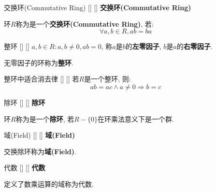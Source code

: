 \documentclass[UTF8]{ctexart}
\begin{document}
		\begin{dfn}
            []
            {交换环(Commutative Ring)}
            []
            []
			\textbf{交换环(Commutative Ring)}

			环$R$称为是一个\textbf{交换环(Commutative Ring)}, 若: 
			\[\forall a,b\in R, ab=ba\]
		\end{dfn}
		
		\begin{dfn}
            []
            {整环}
            []
            []
            $a,b\in R: a,b\neq 0, ab=0$, 称$a$是$b$的\textbf{左零因子}, $b$是$a$的\textbf{右零因子}. 

			无零因子的环称为\textbf{整环}. 
		\end{dfn}
		
		\begin{ppt}
            []
            {整环中适合消去律}
            []
            []
            若$R$是一个整环, 则: 
			\[ab=ac\wedge a\neq 0\Longrightarrow b=c\]
		\end{ppt}
		
		\begin{dfn}
            []
            {除环}
            []
            []
			\textbf{除环}

			环$R$称为是一个\textbf{除环}, 若$R-\{0\}$在环乘法意义下是一个群. 
		\end{dfn}
		
		\begin{dfn}
            []
            {域(Field)}
            []
            []
			\textbf{域(Field)}

			交换除环称为\textbf{域(Field)}. 
		\end{dfn}


		
		\begin{dfn}
            []
            {代数}
            []
            []
			\textbf{代数}

			定义了数乘运算的域称为代数. 
		\end{dfn}
\end{document}
